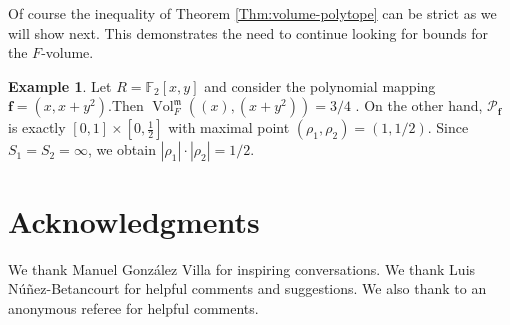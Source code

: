 \documentclass[12pt]{amsart}
\theoremstyle{definition}
\newtheorem{example}[theorem]{Example}
\numberwithin{equation}{subsection}
\newcommand{\FF}{\mathbb{F}}
\newcommand{\m}{\mathfrak{m}}
\newcommand{\SP}{\mathcal{P}}
\newcommand{\Bf}{\boldsymbol{f}}
\newcommand{\Vol}{\operatorname{Vol}}
\renewcommand{\!}[1]{{\color{red}\text{\Huge$\star$ }#1}}
\begin{document}
Of course the inequality of Theorem \ref{Thm:volume-polytope} can be strict as we will show next. This demonstrates the need to continue looking for bounds for the $F$-volume.
\begin{example}\label{equality-fail1}
Let $R=\FF_2[x,y]$ and consider the polynomial mapping $\Bf=(x,x+y^2)$.Then $\Vol_F^{\m}((x),(x+y^2))=3/4$ \cite[Example $2.15$]{BCNBRV}. 
On the other hand, $\SP_{\Bf}$ is exactly $[0,1]\times \left[0,\frac{1}{2}\right]$ with maximal point $(\rho_1,\rho_2)=(1,1/2)$. Since $S_1=S_2=\infty$, we obtain $|\rho_1| \cdot |\rho_2| =1/2$. 
\end{example}
		
\section*{Acknowledgments}
We thank  Manuel Gonz\'{a}lez Villa for inspiring conversations. We thank Luis N\'{u}{\~n}ez-Betancourt for helpful comments and suggestions. We also
thank to an anonymous referee for helpful comments.

\providecommand{\bysame}{\leavevmode\hbox to3em{\hrulefill}\thinspace}
\bigskip
\end{document}
